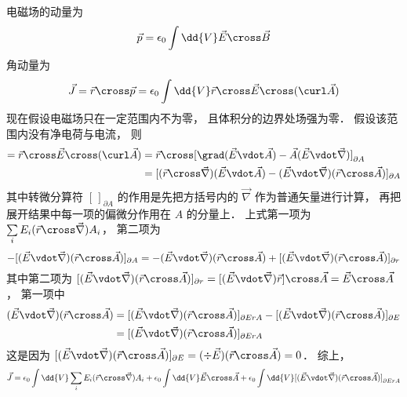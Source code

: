 
电磁场的动量为
\begin{equation}
\vec p = \epsilon_0 \int \dd{V} \vec E \cross \vec B
\end{equation}
角动量为
\begin{equation}
\vec J = \vec r \cross \vec p = \epsilon_0 \int \dd{V} \vec r \cross \vec E \cross (\curl \vec A)
\end{equation}
现在假设电磁场只在一定范围内不为零， 且体积分的边界处场强为零． 假设该范围内没有净电荷与电流， 则
\begin{equation}
\begin{aligned}
=\vec r \cross \vec E \cross (\curl \vec A) &= \vec r \cross [\grad (\vec E \vdot \vec A) - \vec A(\vec E \vdot \vec\nabla )]_{\partial A} \\
&= [(\vec r \cross \vec\nabla )(\vec E \vdot \vec A) - (\vec E \vdot \vec\nabla )(\vec r \cross \vec A)]_{\partial A}
\end{aligned}
\end{equation}
其中转微分算符 $[\,]_{\partial A}$ 的作用是先把方括号内的 $\vec\nabla$ 作为普通矢量进行计算， 再把展开结果中每一项的偏微分作用在 $A$ 的分量上． 上式第一项为 $\sum\limits_i {E_i} (\vec r \cross \vec\nabla ) A_i$， 第二项为
\begin{equation}
-[(\vec E \vdot \vec\nabla )(\vec r \cross \vec A)]_{\partial A} =  - (\vec E \vdot \vec\nabla )(\vec r \cross \vec A) + [(\vec E \vdot \vec\nabla )(\vec r \cross \vec A)]_{\partial r}
\end{equation}
其中第二项为 $[(\vec E \vdot \vec\nabla )(\vec r \cross \vec A)]_{\partial r} = [(\vec E \vdot \vec\nabla )\vec r] \cross \vec A = \vec E \cross \vec A$， 第一项中
\begin{equation}
\begin{aligned}
(\vec E \vdot \vec\nabla )(\vec r \cross \vec A) &= [(\vec E \vdot \vec\nabla )(\vec r \cross \vec A)]_{\partial ErA} - [(\vec E \vdot \vec\nabla )(\vec r \cross \vec A)]_{\partial E}\\
& = [(\vec E \vdot \vec\nabla )(\vec r \cross \vec A)]_{\partial ErA}
\end{aligned}
\end{equation}
这是因为 $[(\vec E \vdot \vec\nabla )(\vec r \cross \vec A)]_{\partial E} = (\div\vec E)(\vec r \cross \vec A) = 0$．  综上，
\begin{equation}
\vec J = \epsilon_0 \int \dd{V} \sum_i  E_i (\vec r \cross \vec\nabla ) A_i + \epsilon_0 \int \dd{V} \vec E \cross \vec A + \epsilon_0 \int \dd{V} [(\vec E \vdot \vec\nabla )(\vec r \cross \vec A)]_{\partial ErA}
\end{equation}
